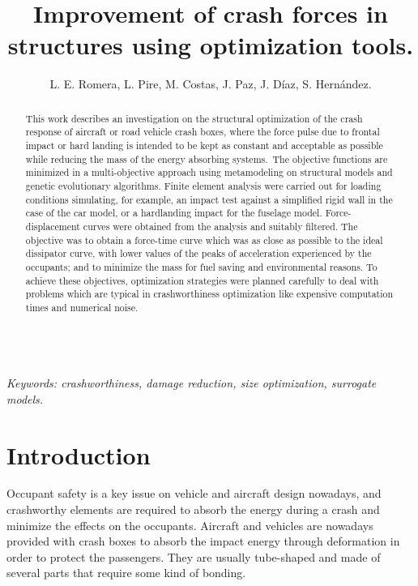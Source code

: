 \documentclass[cmfonts]{witpress}
\begin{document}
\title{Improvement of crash forces in structures using optimization tools.}

\author{L. E. Romera, L. Pire, M. Costas, J. Paz, J. D\'iaz, S. Hern\'andez.}

\address{Structural Mechanics Group, Universidade da Coru\~na, Spain.}

\maketitle

\begin{abstract}
This work describes an investigation on the structural optimization of the crash response of aircraft or road vehicle crash boxes, where the force pulse due to frontal impact or hard landing is intended to be kept as constant and acceptable as possible while reducing the mass of the energy absorbing systems. The objective functions are minimized in a multi-objective approach using metamodeling on structural models and genetic evolutionary algorithms. Finite element analysis were carried out for loading conditions simulating, for example, an impact test against a simplified rigid wall in the case of the car model, or a hardlanding impact for the fuselage model. Force-displacement curves were obtained from the analysis and suitably filtered. The objective was to obtain a force-time curve which was as close as possible to the ideal dissipator curve, with lower values of the peaks of acceleration experienced by the occupants; and to minimize the mass for fuel saving and environmental reasons. To achieve these objectives, optimization strategies were planned carefully to deal with problems which are typical in crashworthiness optimization like expensive computation times and numerical noise.
\end{abstract}\\
\emph{Keywords: crashworthiness, damage reduction, size optimization, surrogate models.}

\section{Introduction}
Occupant safety is a key issue on vehicle and aircraft design nowadays, and crashworthy elements are required to absorb the energy during a crash and minimize the effects on the occupants. Aircraft and vehicles are nowadays provided with crash boxes to absorb the impact energy through deformation in order to protect the passengers. They are usually tube-shaped and made of several parts that require some kind of bonding.
\end{document}
